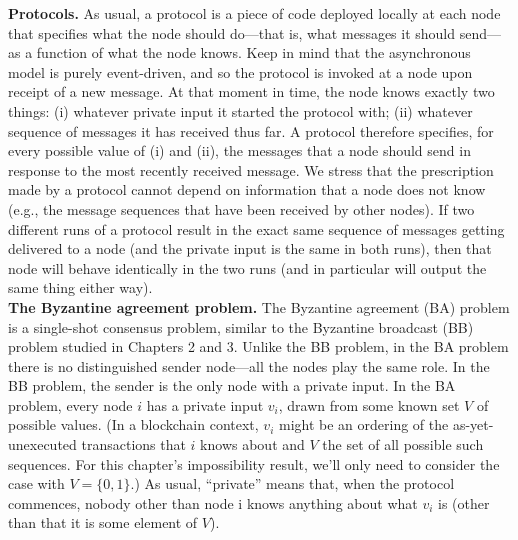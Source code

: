 \noindent
\textbf{Protocols.} As usual, a protocol is a piece of code deployed locally at each node that specifies what
the node should do—that is, what messages it should send—as a function of what the
node knows. Keep in mind that the asynchronous model is purely event-driven, and so the
protocol is invoked at a node upon receipt of a new message. At that moment in time, the node knows exactly two things: (i) whatever private input it started the protocol with; (ii) whatever sequence of messages it has received thus far. A protocol therefore specifies, for
every possible value of (i) and (ii), the messages that a node should send in response to the
most recently received message. We stress that the prescription made by a protocol cannot
depend on information that a node does not know (e.g., the message sequences that have
been received by other nodes). If two different  runs of a protocol result in the exact same
sequence of messages getting delivered to a node (and the private input is the same in both
runs), then that node will behave identically in the two runs (and in particular will output
the same thing either way).\\

\noindent
\textbf{The Byzantine agreement problem.} The Byzantine agreement (BA) problem is a
single-shot consensus problem, similar to the Byzantine broadcast (BB) problem studied
in Chapters 2 and 3. Unlike the BB problem, in the BA problem there is no distinguished
sender node—all the nodes play the same role. In the BB problem, the sender is the only
node with a private input. In the BA problem, every node $i$ has a private input $v_i$, drawn
from some known set $V$ of possible values. (In a blockchain context, $v_i$ might be an ordering of the as-yet-unexecuted transactions that $i$ knows about and $V$ the set of all possible such sequences. For this chapter’s impossibility result, we’ll only need to consider the case
with $V = \{0, 1\}$.) As usual, “private” means that, when the protocol commences, nobody
other than node i knows anything about what $v_i$ is (other than that it is some element of $V$).\\

